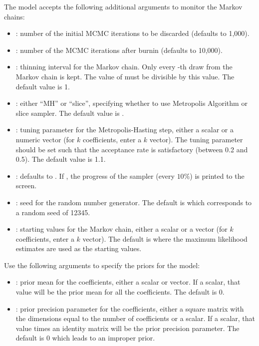 \documentclass[letterpaper,10pt,english]{sphinxmanual}
\begin{document}
The model accepts the following additional arguments to monitor the
Markov chains:
\begin{itemize}
\item {} 
: number of the initial MCMC iterations to be discarded
(defaults to 1,000).

\item {} 
: number of the MCMC iterations after burnin (defaults to
10,000).

\item {} 
: thinning interval for the Markov chain. Only every
-th draw from the Markov chain is kept. The value of 
must be divisible by this value. The default value is 1.

\item {} 
: either “MH” or “slice”, specifying whether to use
Metropolis Algorithm or slice sampler. The default value is .

\item {} 
: tuning parameter for the Metropolis-Hasting step, either a
scalar or a numeric vector (for \(k\) coefficients, enter a
\(k\) vector). The tuning parameter should be set such that the
acceptance rate is satisfactory (between 0.2 and 0.5). The default
value is 1.1.

\item {} 
: defaults to . If , the progress of the
sampler (every \(10\%\)) is printed to the screen.

\item {} 
: seed for the random number generator. The default is 
which corresponds to a random seed of 12345.

\item {} 
: starting values for the Markov chain, either a scalar
or a vector (for \(k\) coefficients, enter a \(k\) vector).
The default is  where the maximum likelihood estimates are used
as the starting values.

\end{itemize}

Use the following arguments to specify the priors for the model:
\begin{itemize}
\item {} 
: prior mean for the coefficients, either a scalar or vector.
If a scalar, that value will be the prior mean for all the
coefficients. The default is 0.

\item {} 
: prior precision parameter for the coefficients, either a
square matrix with the dimensions equal to the number of coefficients
or a scalar. If a scalar, that value times an identity matrix will be
the prior precision parameter. The default is 0 which leads to an
improper prior.

\end{itemize}
\end{document}

